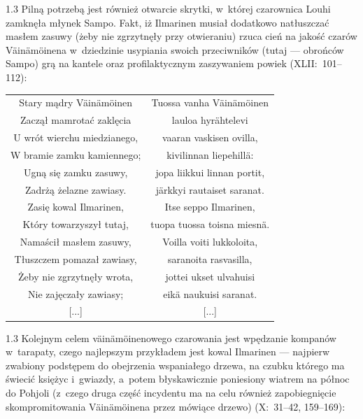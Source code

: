 \documentclass[11pt,a4paper,twoside]{report}
\begin{document}
\newpage
\begin{spacing}{1.3}
Pilną potrzebą jest również otwarcie skrytki, w~której czarownica Louhi zamknęła młynek Sampo. Fakt, iż Ilmarinen musiał dodatkowo natłuszczać masłem zasuwy (żeby nie zgrzytnęły przy otwieraniu) rzuca cień na jakość czarów Väinämöinena w~dziedzinie usypiania swoich przeciwników (tutaj --- obrońców Sampo) grą na kantele oraz profilaktycznym zaszywaniem powiek (XLII:~101--112):
\end{spacing}
{\centering
\small
\begin{longtable}{c c}
Stary mądry Väinämöinen		& Tuossa vanha Väinämöinen\\
Zaczął mamrotać zaklęcia		& lauloa hyrähtelevi\\
U wrót wierchu miedzianego, 		& vaaran vaskisen ovilla,\\
W bramie zamku kamiennego; 		& kivilinnan liepehillä:\\
Ugną się zamku zasuwy, 			& jopa liikkui linnan portit,\\
Zadrżą żelazne zawiasy. 			& järkkyi rautaiset saranat.\\
Zasię kowal Ilmarinen, 			& Itse seppo Ilmarinen,\\
Który towarzyszył tutaj, 			& tuopa tuossa toisna miesnä.\\
Namaścił masłem zasuwy, 		& Voilla voiti lukkoloita,\\
Tłuszczem pomazał zawiasy, 		& saranoita rasvasilla,\\
Żeby nie zgrzytnęły wrota, 		& jottei ukset ulvahuisi\\
Nie zajęczały zawiasy; 			& eikä naukuisi saranat.\\
{[...]}					& {[...]}\\
\end{longtable}
}
\begin{spacing}{1.3}
Kolejnym celem väinämöinenowego czarowania jest wpędzanie kompanów w~tarapaty, czego najlepszym przykładem jest kowal Ilmarinen --- najpierw zwabiony podstępem do obejrzenia wspaniałego drzewa, na czubku którego ma świecić księżyc i~gwiazdy, a~potem błyskawicznie poniesiony wiatrem na północ do Pohjoli (z~czego druga część incydentu ma na celu również zapobiegnięcie skompromitowania Väinämöinena przez mówiące drzewo) (X:~31--42, 159--169):
\end{spacing}
\end{document}
